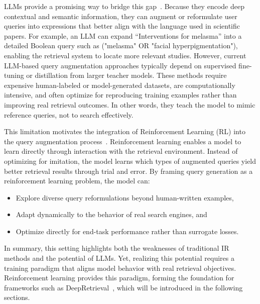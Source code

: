 LLMs provide a promising way to bridge this gap~\cite{kim2024augmenting}. Because they encode deep contextual and semantic information, they can augment or reformulate user queries into expressions that better align with the language used in scientific papers. For example, an LLM can expand “Interventions for melasma” into a detailed Boolean query such as ("melasma" OR "facial hyperpigmentation"), enabling the retrieval system to locate more relevant studies. However, current LLM-based query augmentation approaches typically depend on supervised fine-tuning or distillation from larger teacher models. These methods require expensive human-labeled or model-generated datasets, are computationally intensive, and often optimize for reproducing training examples rather than improving real retrieval outcomes. In other words, they teach the model to mimic reference queries, not to search effectively.

This limitation motivates the integration of Reinforcement Learning (RL) into the query augmentation process~\cite{ma2023query}. Reinforcement learning enables a model to learn directly through interaction with the retrieval environment. Instead of optimizing for imitation, the model learns which types of augmented queries yield better retrieval results through trial and error. By framing query generation as a reinforcement learning problem, the model can: 
\begin{itemize}
    \item Explore diverse query reformulations beyond human-written examples,
    \item Adapt dynamically to the behavior of real search engines, and
    \item Optimize directly for end-task performance rather than surrogate losses.
\end{itemize}

In summary, this setting highlights both the weaknesses of traditional IR methods and the potential of LLMs. Yet, realizing this potential requires a training paradigm that aligns model behavior with real retrieval objectives. Reinforcement learning provides this paradigm, forming the foundation for frameworks such as DeepRetrieval~\cite{jiang2025deepretrieval}, which will be introduced in the following sections.

